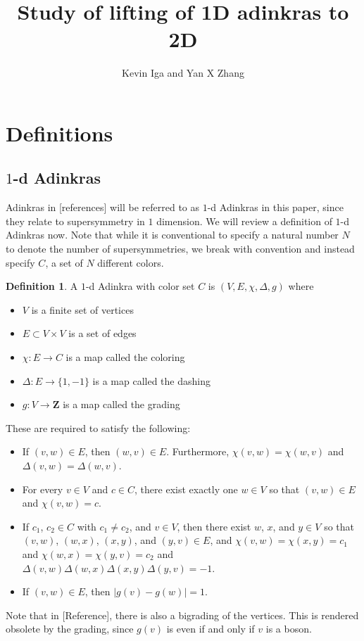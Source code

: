 \documentclass[12pt,twoside,singlespace]{article}
\title{Study of lifting of 1D adinkras to 2D}
\author{Kevin Iga and Yan X Zhang}
\numberwithin{equation}{section}
\theoremstyle{definition}
\newtheorem{definition}[equation]{Definition}
\newcommand{\ZZ}{\mathbf{Z}}
\begin{document}
\pagestyle{plain}

\maketitle

\section{Definitions}

\subsection{$1$-d Adinkras}
Adinkras in [references] will be referred to as $1$-d Adinkras in this paper, since they relate to supersymmetry in $1$ dimension.  We will review a definition of $1$-d Adinkras now.  Note that while it is conventional to specify a natural number $N$ to denote the number of supersymmetries, we break with convention and instead specify $C$, a set of $N$ different colors.

\begin{definition}
A $1$-d Adinkra with color set $C$ is $(V,E,\chi,\Delta,g)$ where
\begin{itemize}
\item $V$ is a finite set of vertices
\item $E\subset V\times V$ is a set of edges
\item $\chi:E\to C$ is a map called the coloring
\item $\Delta:E\to \{1,-1\}$ is a map called the dashing
\item $g:V\to\ZZ$ is a map called the grading
\end{itemize}

These are required to satisfy the following:
\begin{itemize}
\item If $(v,w)\in E$, then $(w,v)\in E$.  Furthermore, $\chi(v,w)=\chi(w,v)$ and $\Delta(v,w)=\Delta(w,v)$.
\item For every $v\in V$ and $c\in C$, there exist exactly one $w\in V$ so that $(v,w)\in E$ and $\chi(v,w)=c$.
\item If $c_1$, $c_2\in C$ with $c_1\not=c_2$, and $v\in V$, then there exist $w$, $x$, and $y\in V$ so that $(v,w)$, $(w,x)$, $(x,y)$, and $(y,v)\in E$, and $\chi(v,w)=\chi(x,y)=c_1$ and $\chi(w,x)=\chi(y,v)=c_2$ and $\Delta(v,w)\Delta(w,x)\Delta(x,y)\Delta(y,v)=-1$.
\item If $(v,w)\in E$, then $|g(v)-g(w)|=1$.
\end{itemize}
\end{definition}
Note that in [Reference], there is also a bigrading of the vertices.  This is rendered obsolete by the grading, since $g(v)$ is even if and only if $v$ is a boson.
\end{document}
